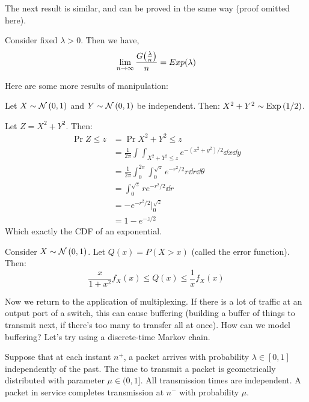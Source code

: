 The next result is similar, and can be proved in the same way (proof omitted here).

\begin{theorem}
    Consider fixed $\lambda > 0$. Then we have,
    \[ \lim_{n \to \infty} \frac{G\qty(\frac{\lambda}{n})}{n} = Exp(\lambda) \]
\end{theorem}

Here are some more results of manipulation:
\begin{theorem}
    Let $X \sim \mathcal{N}\left( 0, 1 \right)$ and $Y \sim \mathcal{N}\left( 0, 1 \right)$ be independent. Then: $X^2 + Y^2 \sim \text{Exp}\left( 1/2 \right)$.

    \begin{proof*}
        Let $Z = X^2 + Y^2$. Then:
        \begin{align*}
            \Pr{Z \leq z} &= \Pr{X^2 + Y^2 \leq z} \\
            &= \frac{1}{2\pi} \int \int_{X^2 + Y^2 \leq z} e^{-(x^2 + y^2)/2} \dd{x} \dd{y} \\
            &= \frac{1}{2\pi} \int_{0}^{2 \pi} \int_{0}^{\sqrt{z}} e^{-r^2/2} r \dd{r} \dd{\theta} \\
            &= \int_{0}^{\sqrt{z}} r e^{-r^2/2} \dd{r} \\
            &= - e^{-r^2/2} \Big|_0^{\sqrt{z}} \\
            &= 1 - e^{-z/2}
        \end{align*}
        Which exactly the CDF of an exponential.
    \end{proof*}
\end{theorem}

\begin{theorem}
    Consider $X \sim \mathcal{N}\left( 0, 1 \right)$. Let $Q(x) = P(X > x)$ (called the error function). Then:
    \[\frac{x}{1 + x^2} f_X(x) \leq Q(x) \leq \frac{1}{x} f_X(x)\]
\end{theorem}

Now we return to the application of multiplexing. If there is a lot of traffic at an output port of a switch,
this can cause buffering (building a buffer of things to transmit next, if there's too many to transfer all at once).
How can we model buffering? Let's try using a discrete-time Markov chain.

Suppose that at each instant $n^+$, a packet arrives with probability $\lambda \in [0, 1]$ independently
of the past. The time to transmit a packet is geometrically distributed with parameter $\mu \in (0, 1]$. All transmission
times are independent. A packet in service completes transmission at $n^-$ with probability $\mu$.

